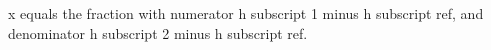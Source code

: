 x equals the fraction with numerator h subscript 1 minus h subscript ref, and denominator h subscript 2 minus h subscript ref.
